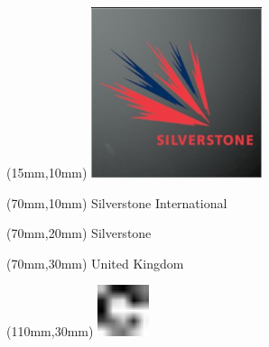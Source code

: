 \null\newpage
\begin{textblock*}{50mm}(15mm,10mm)%
\includegraphics[width=50mm]{LG/2015-05-20_00094.png}
\end{textblock*}
\begin{textblock*}{130mm}(70mm,10mm)%
{\fontsize{20}{20}\selectfont Silverstone International}\\
\end{textblock*}
\begin{textblock*}{120mm}(70mm,20mm)%
{\fontsize{16}{16}\selectfont Silverstone}\\
\end{textblock*}
\begin{textblock*}{120mm}(70mm,30mm)%
{\fontsize{12}{12}\selectfont United Kingdom}
\end{textblock*}
\begin{textblock*}{30mm}(110mm,30mm)%
\centering
\includegraphics[height=15mm]{icons/fa-rotate-right.pdf}
\end{textblock*}
